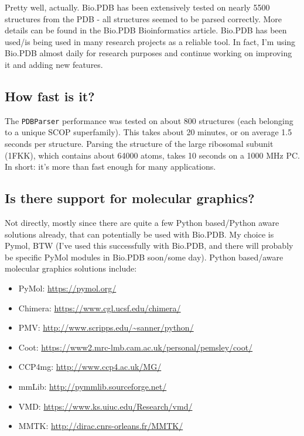 Pretty well, actually. Bio.PDB has been extensively tested on nearly
5500 structures from the PDB - all structures seemed to be parsed
correctly. More details can be found in the Bio.PDB Bioinformatics
article. Bio.PDB has been used/is being used in many research projects
as a reliable tool. In fact, I'm using Bio.PDB almost daily for research
purposes and continue working on improving it and adding new features.

\subsection{How fast is it?}

The \texttt{PDBParser} performance was tested on about 800 structures
(each belonging to a unique SCOP superfamily). This takes about 20
minutes, or on average 1.5 seconds per structure. Parsing the structure
of the large ribosomal subunit (1FKK), which contains about 64000
atoms, takes 10 seconds on a 1000 MHz PC. In short: it's more than
fast enough for many applications.

\subsection{Is there support for molecular graphics?}

Not directly, mostly since there are quite a few Python based/Python
aware solutions already, that can potentially be used with Bio.PDB.
My choice is Pymol, BTW (I've used this successfully with Bio.PDB,
and there will probably be specific PyMol modules in Bio.PDB soon/some
day). Python based/aware molecular graphics solutions include:

\begin{itemize}
\item PyMol: \url{https://pymol.org/}
\item Chimera: \url{https://www.cgl.ucsf.edu/chimera/}
\item PMV: \url{http://www.scripps.edu/~sanner/python/}
\item Coot: \url{https://www2.mrc-lmb.cam.ac.uk/personal/pemsley/coot/}
\item CCP4mg: \url{http://www.ccp4.ac.uk/MG/}
\item mmLib: \url{http://pymmlib.sourceforge.net/}
\item VMD: \url{https://www.ks.uiuc.edu/Research/vmd/}
\item MMTK: \url{http://dirac.cnrs-orleans.fr/MMTK/}
\end{itemize}

